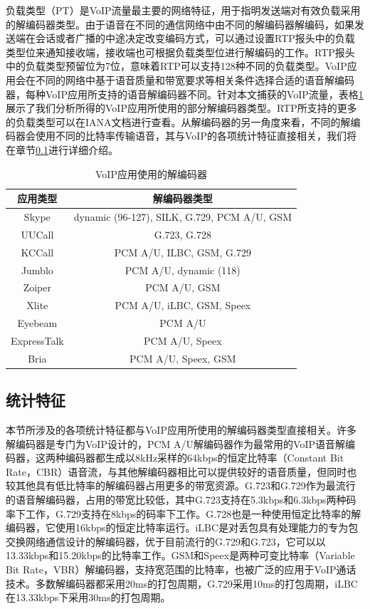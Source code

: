 负载类型（PT）是VoIP流量最主要的网络特征，用于指明发送端对有效负载采用的解编码器类型。由于语音在不同的通信网络中由不同的解编码器解编码，如果发送端在会话或者广播的中途决定改变编码方式，可以通过设置RTP报头中的负载类型位来通知接收端，接收端也可根据负载类型位进行解编码的工作。RTP报头中的负载类型预留位为7位，意味着RTP可以支持128种不同的负载类型。VoIP应用会在不同的网络中基于语音质量和带宽要求等相关条件选择合适的语音解编码器，每种VoIP应用所支持的语音解编码器不同。针对本文捕获的VoIP流量，表格\ref{tab:codecs}展示了我们分析所得的VoIP应用所使用的部分解编码器类型。RTP所支持的更多的负载类型可以在IANA文档\supercite{rtppt}进行查看。从解编码器的另一角度来看，不同的解编码器会使用不同的比特率传输语音，其与VoIP的各项统计特征直接相关，我们将在章节\ref{sec:statisticalfeatures}进行详细介绍。

\begin{table}[htbp]
  \caption{VoIP应用使用的解编码器}
  \label{tab:codecs}
  \centering
  \begin{tabular}{c c}
    \hline
    \textbf{应用类型} & \textbf{解编码器类型}\\
    \hline
    Skype      & dynamic (96-127), SILK, G.729, PCM A/U, GSM  \\
    UUCall      & G.723, G.728  \\
    KCCall      & PCM A/U, ILBC, GSM, G.729  \\
    Jumblo      & PCM A/U, dynamic (118)  \\
    Zoiper      & PCM A/U, GSM  \\
    Xlite      &  PCM A/U, iLBC, GSM, Speex \\
    Eyebeam      & PCM A/U  \\
    ExpressTalk      & PCM A/U, Speex  \\
    Bria      & PCM A/U, Speex, GSM  \\
    \hline
  \end{tabular}
\end{table}



\subsection{统计特征}
\label{sec:statisticalfeatures}
本节所涉及的各项统计特征都与VoIP应用所使用的解编码器类型直接相关。许多解编码器是专门为VoIP设计的，PCM A/U解编码器作为最常用的VoIP语音解编码器，这两种编码器都生成以8kHz采样的64kbps的恒定比特率（Constant Bit Rate，CBR）语音流，与其他解编码器相比可以提供较好的语音质量，但同时也较其他具有低比特率的解编码器占用更多的带宽资源。G.723和G.729作为最流行的语音解编码器，占用的带宽比较低，其中G.723支持在5.3kbps和6.3kbps两种码率下工作，G.729支持在8kbps的码率下工作。G.728也是一种使用恒定比特率的解编码器，它使用16kbps的恒定比特率运行。iLBC是对丢包具有处理能力的专为包交换网络通信设计的解编码器，优于目前流行的G.729和G.723，它可以以13.33kbps和15.20kbps的比特率工作。GSM和Speex是两种可变比特率（Variable Bit Rate，VBR）解编码器，支持宽范围的比特率，也被广泛的应用于VoIP通话技术。多数解编码器都采用20ms的打包周期，G.729采用10ms的打包周期，iLBC在13.33kbps下采用30ms的打包周期。

